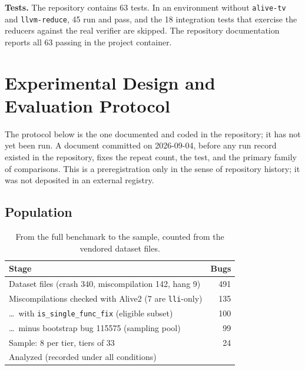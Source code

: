\documentclass[conference]{IEEEtran}
\begin{document}
\textbf{Tests.} The repository contains 63 tests. In an environment without \texttt{alive-tv} and \texttt{llvm-reduce}, 45 run and pass, and the 18 integration tests that exercise the reducers against the real verifier are skipped. The repository documentation reports all 63 passing in the project container.

\section{Experimental Design and Evaluation Protocol}
\label{sec:design}

The protocol below is the one documented and coded in the repository; it has not yet been run. A document committed on 2026-09-04, before any run record existed in the repository, fixes the repeat count, the test, and the primary family of comparisons. This is a preregistration only in the sense of repository history; it was not deposited in an external registry.

\subsection{Population}

\begin{table}[t]
\caption{From the full benchmark to the sample, counted from the vendored dataset files.}
\label{tab:funnel}
\centering\footnotesize
\begin{tabular}{@{}p{6.4cm}r@{}}
\toprule
Stage & Bugs \\
\midrule
Dataset files (crash 340, miscompilation 142, hang 9) & 491 \\
Miscompilations checked with Alive2 (7 are \texttt{lli}-only) & 135 \\
\ldots\ with \texttt{is\_single\_func\_fix} (eligible subset) & 100 \\
\ldots\ minus bootstrap bug 115575 (sampling pool) & 99 \\
Sample: 8 per tier, tiers of 33 & 24 \\
Analyzed (recorded under all conditions) &  \\
\bottomrule
\end{tabular}
\end{table}
\end{document}
